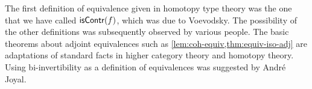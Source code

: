 


\sectionNotes

The first definition of equivalence given in homotopy type theory was the one that we have called $\mathsf{isContr}(f)$, which was due to Voevodsky.
The possibility of the other definitions was subsequently observed by various people.
The basic theorems about adjoint equivalences such as \autoref{lem:coh-equiv,thm:equiv-iso-adj} are adaptations of standard facts in higher category theory and homotopy theory.
Using bi-invertibility as a definition of equivalences was suggested by Andr\'e Joyal.

